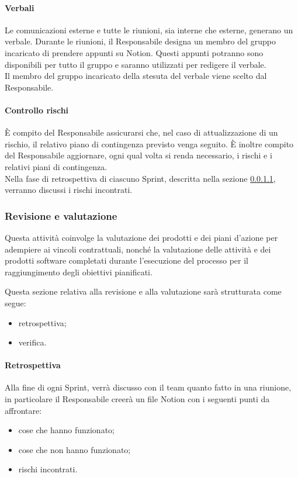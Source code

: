     \paragraph{Verbali} \label{sec:exe-verbali}
    Le comunicazioni esterne e tutte le riunioni, sia interne che esterne, generano un verbale. Durante le riunioni, il Responsabile designa un membro del gruppo incaricato di prendere appunti su Notion. Questi appunti potranno sono disponibili per tutto il gruppo e saranno utilizzati per redigere il verbale. \\
    Il membro del gruppo incaricato della stesuta del verbale viene scelto dal Responsabile.



    \paragraph{Controllo rischi}
    È compito del Responsabile assicurarsi che, nel caso di attualizzazione di un rischio, il relativo piano di contingenza previsto venga seguito.
    È inoltre compito del Responsabile aggiornare, ogni qual volta si renda necessario, i rischi e i relativi piani di contingenza.\\
    Nella fase di retrospettiva di ciascuno Sprint, descritta nella sezione \ref{sec:val-retrospettiva}, verranno discussi i rischi incontrati.

    \subsubsection{Revisione e valutazione}\label{sec:review}
    Questa attività coinvolge la valutazione dei prodotti e dei piani d'azione per adempiere ai vincoli contrattuali, nonché la valutazione delle attività e dei prodotti software completati durante l'esecuzione del processo per il raggiungimento degli obiettivi pianificati.

    \noindent
    Questa sezione relativa alla revisione e alla valutazione sarà strutturata come segue:
    \begin{itemize}
        \item retrospettiva;
        \item verifica.
    \end{itemize}

    \paragraph{Retrospettiva} \label{sec:val-retrospettiva}
        Alla fine di ogni Sprint, verrà discusso con il team quanto fatto in una riunione, in particolare il Responsabile creerà un file Notion con i seguenti punti da affrontare:
        \begin{itemize}
            \item cose che hanno funzionato;
            \item cose che non hanno funzionato;
            \item rischi incontrati.
        \end{itemize}

